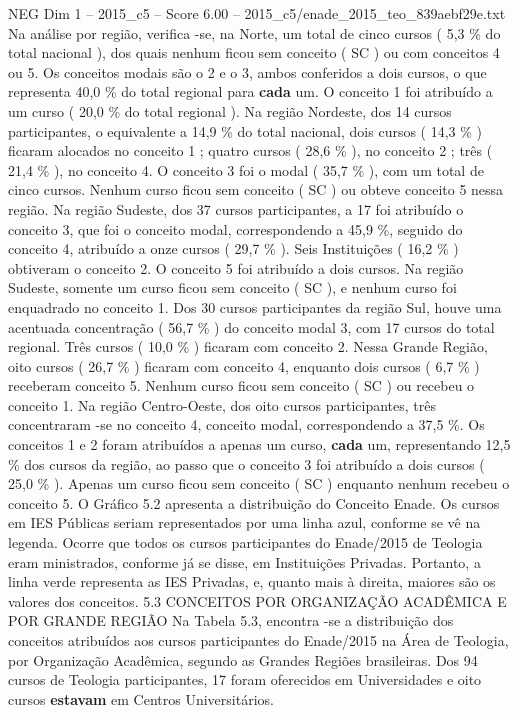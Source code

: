\begin{textsample}{NEG Dim 1 – 2015\_c5 – Score 6.00 – 2015\_c5/enade\_2015\_teo\_839aebf29e.txt}
Na análise por região, verifica -se, na Norte, um total de cinco cursos ( 5,3 \% do total nacional ), dos quais nenhum ficou sem conceito ( SC ) ou com conceitos 4 ou 5.
Os conceitos modais são o 2 e o 3, ambos conferidos a dois cursos, o que representa 40,0 \% do total regional para \textbf{cada} um.
O conceito 1 foi atribuído a um curso ( 20,0 \% do total regional ).
Na região Nordeste, dos 14 cursos participantes, o equivalente a 14,9 \% do total nacional, dois cursos ( 14,3 \% ) ficaram alocados no conceito 1 ; quatro cursos ( 28,6 \% ), no conceito 2 ; três ( 21,4 \% ), no conceito 4.
O conceito 3 foi o modal ( 35,7 \% ), com um total de cinco cursos.
Nenhum curso ficou sem conceito ( SC ) ou obteve conceito 5 nessa região.
Na região Sudeste, dos 37 cursos participantes, a 17 foi atribuído o conceito 3, que foi o conceito modal, correspondendo a 45,9 \%, seguido do conceito 4, atribuído a onze cursos ( 29,7 \% ).
Seis Instituições ( 16,2 \% ) obtiveram o conceito 2.
O conceito 5 foi atribuído a dois cursos.
Na região Sudeste, somente um curso ficou sem conceito ( SC ), e nenhum curso foi enquadrado no conceito 1.
Dos 30 cursos participantes da região Sul, houve uma acentuada concentração ( 56,7 \% ) do conceito modal 3, com 17 cursos do total regional.
Três cursos ( 10,0 \% ) ficaram com conceito 2.
Nessa Grande Região, oito cursos ( 26,7 \% ) ficaram com conceito 4, enquanto dois cursos ( 6,7 \% ) receberam conceito 5.
Nenhum curso ficou sem conceito ( SC ) ou recebeu o conceito 1.
Na região Centro-Oeste, dos oito cursos participantes, três concentraram -se no conceito 4, conceito modal, correspondendo a 37,5 \%.
Os conceitos 1 e 2 foram atribuídos a apenas um curso, \textbf{cada} um, representando 12,5 \% dos cursos da região, ao passo que o conceito 3 foi atribuído a dois cursos ( 25,0 \% ).
Apenas um curso ficou sem conceito ( SC ) enquanto nenhum recebeu o conceito 5.
O Gráfico 5.2 apresenta a distribuição do Conceito Enade.
Os cursos em IES Públicas seriam representados por uma linha azul, conforme se vê na legenda.
Ocorre que todos os cursos participantes do Enade/2015 de Teologia eram ministrados, conforme já se disse, em Instituições Privadas.
Portanto, a linha verde representa as IES Privadas, e, quanto mais à direita, maiores são os valores dos conceitos. 5.3 CONCEITOS POR ORGANIZAÇÃO ACADÊMICA E POR GRANDE REGIÃO Na Tabela 5.3, encontra -se a distribuição dos conceitos atribuídos aos cursos participantes do Enade/2015 na Área de Teologia, por Organização Acadêmica, segundo as Grandes Regiões brasileiras.
Dos 94 cursos de Teologia participantes, 17 foram oferecidos em Universidades e oito cursos \textbf{estavam} em Centros Universitários.

\end{textsample}
